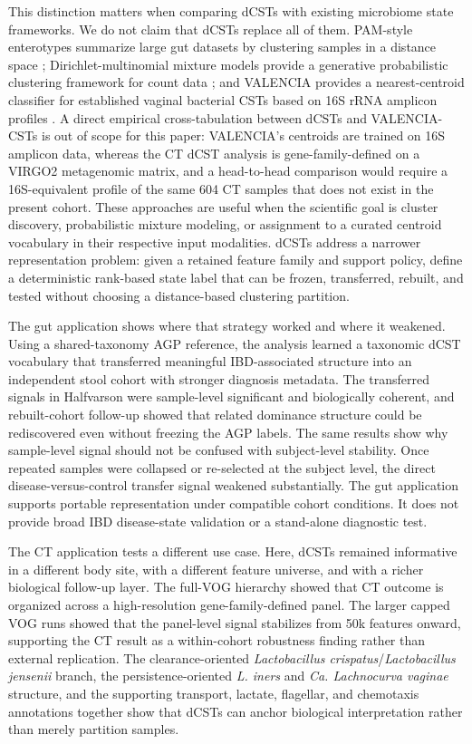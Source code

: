 \documentclass[11pt]{article}
\newcommand{\taxon}[1]{\emph{#1}}
\begin{document}
This distinction matters when comparing dCSTs with existing microbiome state
frameworks. We do not claim that dCSTs replace all of them. PAM-style
enterotypes summarize large gut datasets by clustering samples in a distance space
\cite{Arumugam2011_enterotypes,Costea2018_enterotypes,Knights2014_rethinking};
Dirichlet-multinomial mixture models provide a generative probabilistic
clustering framework for count data \cite{Holmes2012_DMM}; and VALENCIA
provides a nearest-centroid classifier for established vaginal bacterial CSTs
based on 16S rRNA amplicon profiles \cite{France2020_VALENCIA}. A direct
empirical cross-tabulation between dCSTs and VALENCIA-CSTs is out of scope for
this paper: VALENCIA's centroids are trained on 16S amplicon data,
whereas the CT dCST analysis is gene-family-defined on a VIRGO2 metagenomic
matrix, and a head-to-head comparison would require a 16S-equivalent profile of
the same 604 CT samples that does not exist in the present cohort. These
approaches are useful when the scientific goal is cluster discovery,
probabilistic mixture modeling, or assignment to a curated centroid vocabulary
in their respective input modalities. dCSTs address a narrower representation
problem: given a retained feature family and support policy, define a
deterministic rank-based state label that can be frozen, transferred, rebuilt,
and tested without choosing a distance-based clustering partition.

The gut application shows where that strategy worked and where it weakened.
Using a shared-taxonomy AGP reference, the analysis learned a taxonomic dCST
vocabulary that transferred meaningful IBD-associated structure into an
independent stool cohort with stronger diagnosis metadata. The transferred
signals in Halfvarson were sample-level significant and biologically coherent,
and rebuilt-cohort follow-up showed that related dominance structure could be
rediscovered even without freezing the AGP labels. The same results show why
sample-level signal should not be confused with subject-level stability. Once
repeated samples were collapsed or
re-selected at the subject level, the direct disease-versus-control transfer
signal weakened substantially. The gut application supports portable
representation under compatible cohort conditions. It does not provide broad
IBD disease-state validation or a stand-alone diagnostic test.

The CT application tests a different use case. Here, dCSTs remained informative
in a different body site, with a different feature universe, and with a richer
biological follow-up layer. The
full-VOG hierarchy showed that CT outcome is organized across a
high-resolution gene-family-defined panel. The larger capped VOG runs showed
that the panel-level signal stabilizes from 50k features onward, supporting the
CT result as a within-cohort robustness finding rather than external
replication. The clearance-oriented
\taxon{Lactobacillus crispatus}/\taxon{Lactobacillus
jensenii} branch, the persistence-oriented \taxon{L. iners} and
\taxon{Ca. Lachnocurva vaginae} structure, and the supporting transport,
lactate, flagellar, and chemotaxis annotations together show that dCSTs can
anchor biological interpretation rather than merely partition samples.
\end{document}
